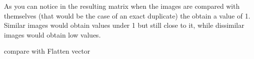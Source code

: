  
As you can notice in the resulting matrix when the images are compared with themselves (that would be the case of an exact duplicate) the obtain a value of 1. Similar images would obtain values under 1 but still close to it, while dissimilar images would obtain low values.




compare with Flatten vector
